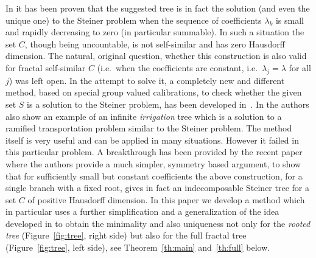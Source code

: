\documentclass{amsart}
\theoremstyle{definition}
\theoremstyle{remark}
\begin{document}
In \cite{PaoSteTep15} it has been proven that 
the suggested tree is in fact the solution (and even the unique one) 
to the Steiner problem when the sequence of coefficients $\lambda_k$
is small and rapidly decreasing to zero (in particular summable).
In such a situation the set $C$, though being uncountable,
is not self-similar and has zero Hausdorff dimension.
The natural, original question, whether this construction is also valid 
for fractal self-similar $C$ (i.e.\ when the coefficients are constant,
i.e.\ $\lambda_j=\lambda$ for all $j$)
was left open.
In the attempt to solve it, a 
completely new and different method, based on special group valued calibrations,
to check whether the given set $S$ is a solution to the Steiner problem,
has been developed in~\cite{MarMas16a}.
In \cite{MarMas16b} the authors also show an example 
of an infinite \emph{irrigation} tree which is a solution to
a ramified transportation problem similar to the Steiner problem.
The method itself is very useful and can be applied in many situations.
However it failed in this particular problem.
A breakthrough has been provided by the recent paper \cite{CheTep23}
where the authors provide a much simpler, symmetry based argument, to show that for 
sufficiently small but constant coefficients the above construction,
for a single branch with a fixed root,
gives in fact an indecomposable Steiner tree for a set $C$ 
of positive Hausdorff dimension.
In this paper we develop a method which in particular uses 
a further simplification and a generalization of 
the idea developed in \cite{CheTep23} to obtain the minimality and also uniqueness 
not only for the \emph{rooted tree} (Figure~\ref{fig:tree}, right side) 
but also for the full fractal tree (Figure~\ref{fig:tree}, left side), 
see Theorem~\ref{th:main} and~\ref{th:full} below.
\end{document}
